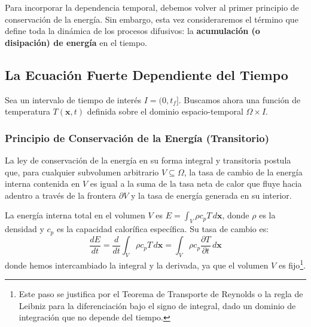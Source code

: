 Para incorporar la dependencia temporal, debemos volver al primer principio de conservación de la energía. Sin embargo, esta vez consideraremos el término que define toda la dinámica de los procesos difusivos: la \textbf{acumulación (o disipación) de energía} en el tiempo.

\subsection{La Ecuación Fuerte Dependiente del Tiempo}
Sea un intervalo de tiempo de interés \(I = (0, t_f]\). Buscamos ahora una función de temperatura \(T(\bm{x}, t)\) definida sobre el dominio espacio-temporal \(\Omega \times I\).

\subsubsection{Principio de Conservación de la Energía (Transitorio)}
La ley de conservación de la energía en su forma integral y transitoria postula que, para cualquier subvolumen arbitrario \(V \subseteq \Omega\), la tasa de cambio de la energía interna contenida en \(V\) es igual a la suma de la tasa neta de calor que fluye hacia adentro a través de la frontera \(\partial V\) y la tasa de energía generada en su interior.

La energía interna total en el volumen \(V\) es \(E = \int_V \rho c_p T \, d\bm{x}\), donde \(\rho\) es la densidad y \(c_p\) es la capacidad calorífica específica. Su tasa de cambio es:
\[
\frac{dE}{dt} = \frac{d}{dt} \int_V \rho c_p T \, d\bm{x} = \int_V \rho c_p \frac{\partial T}{\partial t} \, d\bm{x}
\]
donde hemos intercambiado la integral y la derivada, ya que el volumen \(V\) es fijo\footnote{Este paso se justifica por el Teorema de Transporte de Reynolds o la regla de Leibniz para la diferenciación bajo el signo de integral, dado un dominio de integración que no depende del tiempo.}.

